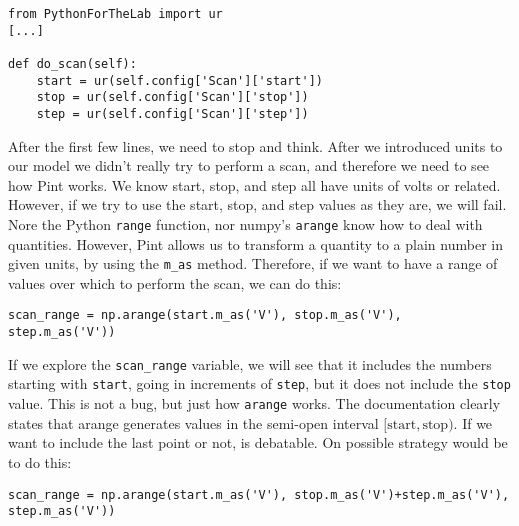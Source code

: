 \begin{verbatim}
from PythonForTheLab import ur
[...]

def do_scan(self):
    start = ur(self.config['Scan']['start'])
    stop = ur(self.config['Scan']['stop'])
    step = ur(self.config['Scan']['step'])
\end{verbatim}

After the first few lines, we need to stop and think. After we introduced units to our model we didn't really try to perform a scan, and therefore we need to see how Pint works. We know start, stop, and step all have units of volts or related. However, if we try to use the start, stop, and step values as they are, we will fail. Nore the Python \texttt{range} function, nor numpy's \texttt{arange} know how to deal with quantities. However, Pint allows us to transform a quantity to a plain number in given units, by using the \texttt{m\_as} method. Therefore, if we want to have a range of values over which to perform the scan, we can do this:

\begin{verbatim}
scan_range = np.arange(start.m_as('V'), stop.m_as('V'), step.m_as('V'))
\end{verbatim}

If we explore the \texttt{scan\_range} variable, we will see that it includes the numbers starting with \texttt{start}, going in increments of \texttt{step}, but it does not include the \texttt{stop} value. This is not a bug, but just how \texttt{arange} works. The documentation clearly states that arange generates values in the semi-open interval $[\textrm{start}, \textrm{stop})$. If we want to include the last point or not, is debatable. On possible strategy would be to do this:

\begin{verbatim}
scan_range = np.arange(start.m_as('V'), stop.m_as('V')+step.m_as('V'), step.m_as('V'))
\end{verbatim}

